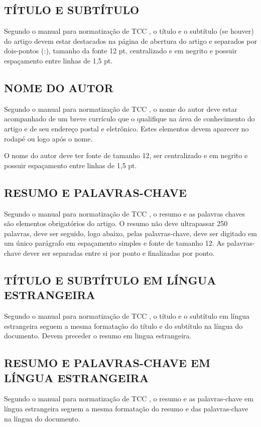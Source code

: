 \subsection{TÍTULO E SUBTÍTULO}
Segundo o manual para normatização de TCC \cite{manualTCC}, o título e o subtítulo (se houver) do artigo devem estar destacados na página de abertura do artigo e separados por dois-pontos (:), tamanho da fonte 12 pt, centralizado e em negrito e possuir espaçamento entre linhas de 1,5 pt.

\subsection{NOME DO AUTOR}
Segundo o manual para normatização de TCC \cite{manualTCC}, o nome do autor deve estar acompanhado de um breve currículo que o qualifique na área de conhecimento do artigo e de seu endereço postal e eletrônico. Estes elementos devem aparecer no rodapé ou logo após o nome.

O nome do autor deve ter fonte de tamanho 12, ser centralizado e em negrito e possuir espaçamento entre linhas de 1,5 pt.

\subsection{RESUMO E PALAVRAS-CHAVE}
Segundo o manual para normatização de TCC \cite{manualTCC}, o resumo e as palavras chaves são elementos obrigatórios do artigo. O resumo não deve ultrapassar 250 palavras, deve ser seguido, logo abaixo, pelas palavras-chave, deve ser digitado em um único parágrafo em espaçamento simples e fonte de tamanho 12. As palavras-chave dever ser separadas entre si por ponto e finalizadas por ponto. 

\subsection{TÍTULO E SUBTÍTULO EM LÍNGUA ESTRANGEIRA}
Segundo o manual para normatização de TCC \cite{manualTCC}, o título e o subtítulo em língua estrangeira seguem a mesma formatação do título e do subtítulo na língua do documento. Devem preceder o resumo em lingua estrangeira.

\subsection{RESUMO E PALAVRAS-CHAVE EM LÍNGUA ESTRANGEIRA}
Segundo o manual para normatização de TCC \cite{manualTCC}, o resumo e as palavras-chave em língua estrangeira seguem a mesma formatação do resumo e das palavras-chave na língua do documento.

